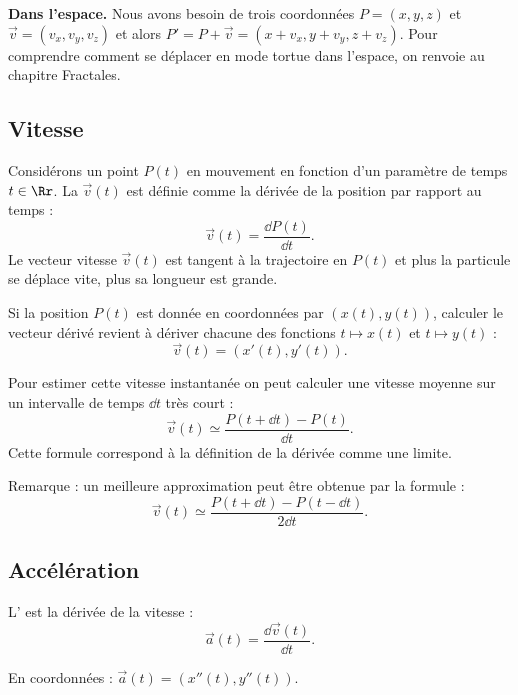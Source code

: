 \documentclass[11pt,class=report,crop=false]{standalone}
\begin{document}

\textbf{Dans l'espace.}
Nous avons besoin de trois coordonnées $P = (x,y,z)$ et $\vec v = (v_x,v_y,v_z)$ et alors $P' = P + \vec v = (x+v_x, y+v_y, z+v_z)$.
Pour comprendre comment se déplacer en mode \og{}tortue\fg{} dans l'espace, on renvoie au chapitre \og{}Fractales\fg{}.


\subsection{Vitesse}

Considérons un point $P(t)$ en mouvement en fonction d'un paramètre de temps $t \in \Rr$. La  $\vec{v}(t)$ est définie comme la dérivée de la position par rapport au temps :
$$\vec{v}(t) = \frac{\dd P(t)}{\dd t}.$$
Le vecteur vitesse $\vec{v}(t)$ est tangent à la trajectoire en $P(t)$ et plus la particule se déplace vite, plus sa longueur est grande.



Si la position $P(t)$ est donnée en coordonnées par $(x(t),y(t))$, calculer le vecteur dérivé revient à dériver chacune des fonctions $t \mapsto x(t)$ et $t \mapsto y(t)$ :
$$\vec{v}(t) = (x'(t), y'(t)).$$

Pour estimer cette vitesse instantanée on peut calculer une vitesse moyenne sur un intervalle de temps $\dd t$ très court :
$$\vec{v}(t) \simeq \frac{P(t + \dd t) - P(t)}{\dd t}.$$
Cette formule correspond à la définition de la dérivée comme une limite.

Remarque : un meilleure approximation peut être obtenue par la formule :
$$\vec{v}(t) \simeq \frac{P(t + \dd t) - P(t-\dd t)}{2\dd t}.$$


\subsection{Accélération}

L' est la dérivée de la vitesse :
$$\vec{a}(t) = \frac{\dd \vec{v}(t)}{\dd t}.$$

En coordonnées : $\vec{a}(t) = (x''(t), y''(t))$.
\end{document}
